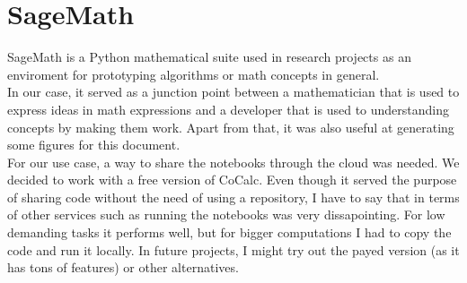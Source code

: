 \section{SageMath}

SageMath\cite{Sage} is a Python mathematical suite used in research projects as
an enviroment for prototyping algorithms or math concepts in general.\\

In our case, it served as a junction point between a mathematician that is used
to express ideas in math expressions and a developer that is used to
understanding concepts by making them work. Apart from that, it was also
useful at generating some figures for this document.\\

For our use case, a way to share the notebooks through the cloud was needed.
We decided to work with a free version of CoCalc\cite{cocalc}. Even though it
served the purpose of sharing code without the need of using a repository,
I have to say that in terms of other services such as running the notebooks
was very dissapointing. For low demanding tasks it performs well, but for
bigger computations I had to copy the code and run it locally. In future
projects, I might try out the payed version (as it has tons of features)
or other alternatives.\\
